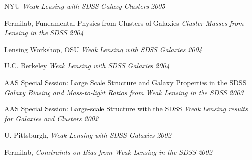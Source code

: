 {NYU {\it Weak Lensing with SDSS Galaxy Clusters} \hfill {\small \it 2005} \newline

Fermilab, Fundamental Physics from Clusters of Galaxies {\it Cluster Masses from Lensing in the SDSS} \hfill {\small \it 2004} \newline

Lensing Workshop, OSU {\it Weak Lensing with SDSS Galaxies} \hfill {\small \it 2004} \newline

U.C. Berkeley {\it Weak Lensing with SDSS Galaxies} \hfill {\small \it 2004} \newline

AAS Special Session: Large Scale Structure and Galaxy Properties in the SDSS {\it Galaxy Biasing and Mass-to-light Ratios from Weak Lensing in the SDSS} \hfill {\small \it 2003} \newline

AAS Special Session: Large-scale Structure with the SDSS {\it Weak Lensing results for Galaxies and Clusters} \hfill {\small \it 2002} \newline

U. Pittsburgh, {\it Weak Lensing with SDSS Galaxies} \hfill {\small \it 2002} \newline

Fermilab, {\it Constraints on Bias from Weak Lensing in the SDSS} \hfill {\small \it 2002} \newline
}
